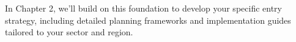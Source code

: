 \begin{importantbox}
In Chapter 2, we'll build on this foundation to develop your specific entry strategy, including detailed planning frameworks and implementation guides tailored to your sector and region.
\end{importantbox}

